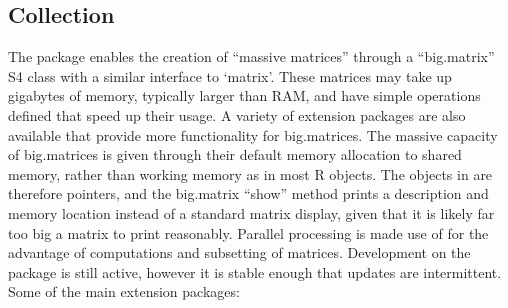 \subsection{ Collection}\label{subsec:bigmemory-collection}

The  package enables the creation of ``massive matrices''
through a ``big.matrix'' S4 class with a similar interface to
`matrix'\cite{kane13:bigmemory}. These matrices may take up gigabytes of
memory, typically larger than RAM, and have simple operations defined
that speed up their usage. A variety of extension packages are also
available that provide more functionality for big.matrices. The massive
capacity of big.matrices is given through their default memory
allocation to shared memory, rather than working memory as in most R
objects. The objects in \R are therefore pointers, and the big.matrix
``show'' method prints a description and memory location instead of a
standard matrix display, given that it is likely far too big a matrix to
print reasonably. Parallel processing is made use of for the advantage
of computations and subsetting of matrices. Development on the package
is still active, however it is stable enough that updates are
intermittent. Some of the main extension packages:

